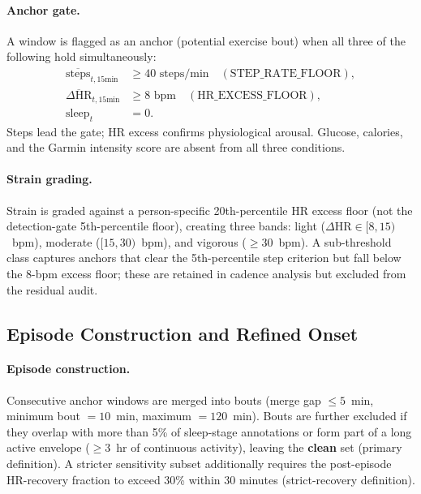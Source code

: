 \paragraph{Anchor gate.}
A window is flagged as an anchor (potential exercise bout) when all three
of the following hold simultaneously:
\begin{align}
  \overline{\mathrm{steps}}_{t,15\text{min}} &\geq 40 \text{ steps/min} \quad (\text{STEP\_RATE\_FLOOR}), \label{eq:gate_steps} \\
  \overline{\Delta\mathrm{HR}}_{t,15\text{min}} &\geq 8 \text{ bpm}    \quad (\text{HR\_EXCESS\_FLOOR}), \label{eq:gate_hr} \\
  \mathrm{sleep}_{t}                            &= 0.                  \label{eq:gate_wake}
\end{align}
Steps lead the gate; HR excess confirms physiological arousal.
Glucose, calories, and the Garmin intensity score are absent from all
three conditions.

\paragraph{Strain grading.}
Strain is graded against a person-specific 20th-percentile HR excess floor
(not the detection-gate 5th-percentile floor), creating three bands:
light ($\Delta\mathrm{HR} \in [8, 15)$~bpm), moderate ($[15, 30)$~bpm),
and vigorous ($\geq\!30$~bpm).
A sub-threshold class captures anchors that clear the 5th-percentile step
criterion but fall below the 8-bpm excess floor; these are retained in
cadence analysis but excluded from the residual audit.

\subsection{Episode Construction and Refined Onset}
\label{subsec:ex_episodes}

\paragraph{Episode construction.}
Consecutive anchor windows are merged into bouts
(merge gap $\leq 5$~min, minimum bout $= 10$~min, maximum $= 120$~min).
Bouts are further excluded if they overlap with more than 5\% of
sleep-stage annotations or form part of a long active envelope
($\geq 3$~hr of continuous activity), leaving the \textbf{clean} set
(primary definition).
A stricter sensitivity subset additionally requires the post-episode
HR-recovery fraction to exceed 30\% within 30 minutes
(strict-recovery definition).

